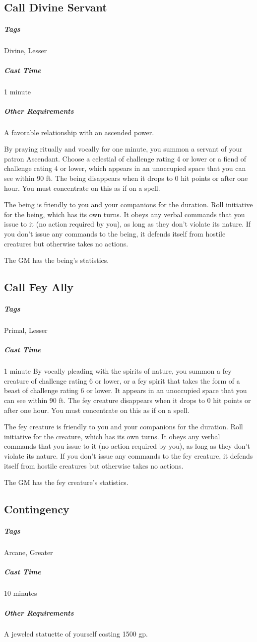 \subsection{Call Divine Servant}
\subparagraph*{Tags} Divine, Lesser
\subparagraph*{Cast Time} 1 minute
\subparagraph*{Other Requirements} A favorable relationship with an ascended power.

By praying ritually and vocally for one minute, you summon a servant of your patron Ascendant. Choose a celestial of challenge rating 4 or lower or a fiend of challenge rating 4 or lower, which appears in an unoccupied space that you can see within 90 ft. The being disappears when it drops to 0 hit points or after one hour. You must concentrate on this as if on a spell.

The being is friendly to you and your companions for the duration. Roll initiative for the being, which has its own turns. It obeys any verbal commands that you issue to it (no action required by you), as long as they don’t violate its nature. If you don’t issue any commands to the being, it defends itself from hostile creatures but otherwise takes no actions.

The GM has the being’s statistics.

\subsection{Call Fey Ally}
\subparagraph*{Tags} Primal, Lesser
\subparagraph*{Cast Time} 1 minute
By vocally pleading with the spirits of nature, you summon a fey creature of challenge rating 6 or lower, or a fey spirit that takes the form of a beast of challenge rating 6 or lower. It appears in an unoccupied space that you can see within 90 ft. The fey creature disappears when it drops to 0 hit points or after one hour. You must concentrate on this as if on a spell.

The fey creature is friendly to you and your companions for the duration. Roll initiative for the creature, which has its own turns. It obeys any verbal commands that you issue to it (no action required by you), as long as they don’t violate its nature. If you don’t issue any commands to the fey creature, it defends itself from hostile creatures but otherwise takes no actions.

The GM has the fey creature’s statistics.

\subsection{Contingency}
\subparagraph*{Tags} Arcane, Greater
\subparagraph*{Cast Time} 10 minutes
\subparagraph*{Other Requirements} A jeweled statuette of yourself costing 1500 gp.

